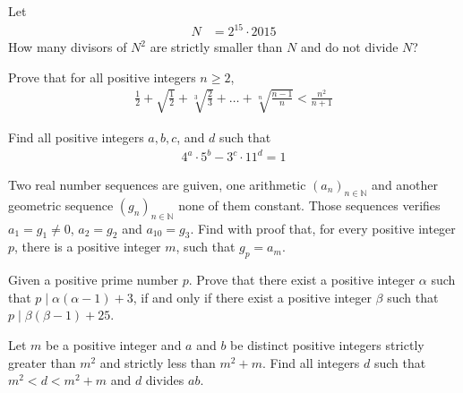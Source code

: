 \documentclass[problems.tex]{subfile}
\begin{document}
	\begin{problem}
		Let
		\begin{align*}
			N &= 2^{15} \cdot 2015
		\end{align*}
		How many divisors of $N^2$ are strictly smaller than $N$ and do not divide $N$?
	\end{problem}

	\begin{problem}
		Prove that for all positive integers $n \geq 2$,
		\begin{align*}
			\frac{1}{2} + \sqrt{\frac{1}{2}}+ \sqrt[3]{\frac{2}{3}}+ \dots + \sqrt[n]{\frac{n-1}{n}} < \frac{n^2}{n+1}
		\end{align*}
	\end{problem}

	\begin{problem}
		Find all positive integers $a, b, c$, and $d$ such that
		\begin{align*}
			4^a \cdot 5^b - 3^c \cdot 11^d = 1
		\end{align*}
	\end{problem}

	\begin{problem}
		Two real number sequences are guiven, one arithmetic $\left(a_n\right)_{n\in \mathbb {N}}$ and another geometric sequence $\left(g_n\right)_{n\in \mathbb {N}}$ none of them constant. Those sequences verifies $a_1=g_1\neq 0$, $a_2=g_2$ and $a_{10}=g_3$. Find with proof that, for every positive integer $p$, there is a positive integer $m$, such that $g_p=a_m$. %
	\end{problem}

	\begin{problem}
		Given a positive prime number $p$. Prove that there exist a positive integer $\alpha$ such that $p\mid \alpha(\alpha-1)+3$, if and only if there exist a positive integer $\beta$ such that $p\mid \beta(\beta-1)+25$. %
	\end{problem}

	\begin{problem}
		Let $m$ be a positive integer and $a$ and $b$ be distinct positive integers strictly greater than $m^2$ and strictly less than $m^2+m$. Find all integers $d$ such that $m^2 < d < m^2+m$ and $d$ divides $ab$. %
	\end{problem}
\end{document}
